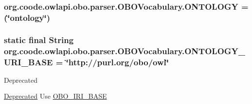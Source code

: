 \hypertarget{enumorg_1_1coode_1_1owlapi_1_1obo_1_1parser_1_1_o_b_o_vocabulary_a21ee99cf7b26d625ef790b87498ecbd1}{
\subsubsection[{O\-N\-T\-O\-L\-O\-G\-Y}]{\setlength{\rightskip}{0pt plus 5cm}org.\-coode.\-owlapi.\-obo.\-parser.\-O\-B\-O\-Vocabulary.\-O\-N\-T\-O\-L\-O\-G\-Y =(\char`\"{}ontology\char`\"{})}}\label{enumorg_1_1coode_1_1owlapi_1_1obo_1_1parser_1_1_o_b_o_vocabulary_a21ee99cf7b26d625ef790b87498ecbd1}
\hypertarget{enumorg_1_1coode_1_1owlapi_1_1obo_1_1parser_1_1_o_b_o_vocabulary_aba55026a762172d8705d240c066d429f}{
\subsubsection[{O\-N\-T\-O\-L\-O\-G\-Y\-\_\-\-U\-R\-I\-\_\-\-B\-A\-S\-E}]{\setlength{\rightskip}{0pt plus 5cm} static  final String org.\-coode.\-owlapi.\-obo.\-parser.\-O\-B\-O\-Vocabulary.\-O\-N\-T\-O\-L\-O\-G\-Y\-\_\-\-U\-R\-I\-\_\-\-B\-A\-S\-E = \char`\"{}http\-://purl.\-org/obo/owl\char`\"{}\hspace{0.3cm}{\ttfamily [static]}}}\label{enumorg_1_1coode_1_1owlapi_1_1obo_1_1parser_1_1_o_b_o_vocabulary_aba55026a762172d8705d240c066d429f}
\begin{DoxyRefDesc}{Deprecated}
\item[\hyperlink{deprecated__deprecated000040}{Deprecated}]Use \hyperlink{enumorg_1_1coode_1_1owlapi_1_1obo_1_1parser_1_1_o_b_o_vocabulary_a100cf24365c118368a03588b58fe2c7d}{O\-B\-O\-\_\-\-I\-R\-I\-\_\-\-B\-A\-S\-E} \end{DoxyRefDesc}
